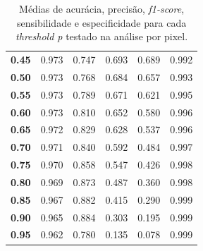 \begin{table}
\begin{tiny}
\begin{tabular}{|l|l|l|l|l|l|}
\cellcolor[HTML]{EFEFEF}\textbf{0.45}   & 0.973                 & 0.747               & 0.693                     & 0.689                    & 0.992                       \\ \cline{1-6}
\cellcolor[HTML]{EFEFEF}\textbf{0.50}   & 0.973                 & 0.768               & 0.684                     & 0.657                    & 0.993                       \\ \cline{1-6}
\cellcolor[HTML]{EFEFEF}\textbf{0.55}   & 0.973                 & 0.789               & 0.671                     & 0.621                    & 0.995                       \\ \cline{1-6} 
\cellcolor[HTML]{EFEFEF}\textbf{0.60}   & 0.973                 & 0.810               & 0.652                     & 0.580                    & 0.996                       \\ \cline{1-6}
\cellcolor[HTML]{EFEFEF}\textbf{0.65}   & 0.972                 & 0.829               & 0.628                     & 0.537                    & 0.996                       \\ \cline{1-6}
\cellcolor[HTML]{EFEFEF}\textbf{0.70}   & 0.971                 & 0.840               & 0.592                     & 0.484                    & 0.997                       \\ \cline{1-6}
\cellcolor[HTML]{EFEFEF}\textbf{0.75}   & 0.970                 & 0.858               & 0.547                     & 0.426                    & 0.998                       \\ \cline{1-6} 
\cellcolor[HTML]{EFEFEF}\textbf{0.80}   & 0.969                 & 0.873               & 0.487                     & 0.360                    & 0.998                       \\ \cline{1-6}
\cellcolor[HTML]{EFEFEF}\textbf{0.85}   & 0.967                 & 0.882               & 0.415                     & 0.290                    & 0.999                       \\ \cline{1-6}
\cellcolor[HTML]{EFEFEF}\textbf{0.90}   & 0.965                 & 0.884               & 0.303                     & 0.195                    & 0.999                       \\ \cline{1-6}
\cellcolor[HTML]{EFEFEF}\textbf{0.95}   & 0.962                 & 0.780               & 0.135                     & 0.078                    & 0.999                       \\ \cline{1-6}
\end{tabular}
\end{tiny}
\caption{Médias de acurácia, precisão, \textit{f1-score}, sensibilidade e especificidade para cada \textit{threshold p} testado na análise por pixel.}
    \label{tab:metricas-variando-p}
\end{table}

